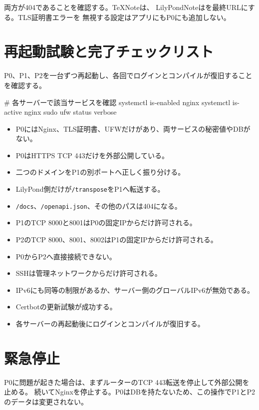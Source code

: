 \documentclass[uplatex,a4paper,11pt]{jsarticle}
\begin{document}
両方が404であることを確認する。TeXNoteは、
LilyPondNoteはを最終URLにする。TLS証明書エラーを
無視する設定はアプリにもP0にも追加しない。

\section{再起動試験と完了チェックリスト}

P0、P1、P2を一台ずつ再起動し、各回でログインとコンパイルが復旧することを確認する。

\begin{command}
# 各サーバーで該当サービスを確認
systemctl is-enabled nginx
systemctl is-active nginx
sudo ufw status verbose
\end{command}

\begin{itemize}
  \item[$\square$] P0にはNginx、TLS証明書、UFWだけがあり、両サービスの秘密値やDBがない。
  \item[$\square$] P0はHTTPS TCP 443だけを外部公開している。
  \item[$\square$] 二つのドメインをP1の別ポートへ正しく振り分ける。
  \item[$\square$] LilyPond側だけが\texttt{/transpose}をP1へ転送する。
  \item[$\square$] \texttt{/docs}、\texttt{/openapi.json}、その他のパスは404になる。
  \item[$\square$] P1のTCP 8000と8001はP0の固定IPからだけ許可される。
  \item[$\square$] P2のTCP 8000、8001、8002はP1の固定IPからだけ許可される。
  \item[$\square$] P0からP2へ直接接続できない。
  \item[$\square$] SSHは管理ネットワークからだけ許可される。
  \item[$\square$] IPv6にも同等の制限があるか、サーバー側のグローバルIPv6が無効である。
  \item[$\square$] Certbotの更新試験が成功する。
  \item[$\square$] 各サーバーの再起動後にログインとコンパイルが復旧する。
\end{itemize}

\section{緊急停止}

P0に問題が起きた場合は、まずルーターのTCP 443転送を停止して外部公開を止める。
続いてNginxを停止する。P0はDBを持たないため、この操作でP1とP2のデータは変更されない。
\end{document}
